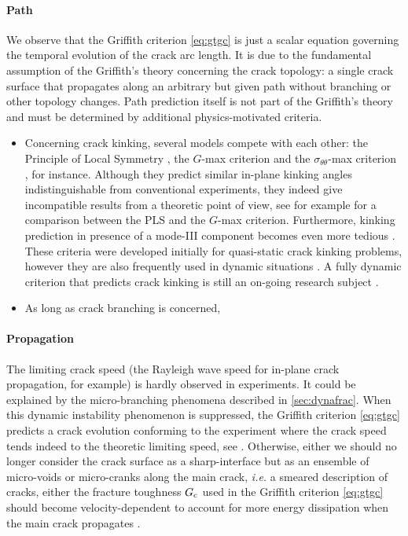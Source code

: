 \paragraph{Path} We observe that the Griffith criterion \eqref{eq:gtgc} is just a scalar equation governing the temporal evolution of the crack arc length. It is due to the fundamental assumption of the Griffith's theory concerning the crack topology: a single crack surface that propagates along an arbitrary but given path without branching or other topology changes. Path prediction itself is not part of the Griffith's theory and must be determined by additional physics-motivated criteria.
\begin{itemize}
\item Concerning crack kinking, several models compete with each other: the Principle of Local Symmetry \cite{GolDstein:1974aa}, the $G$-max criterion \cite{Hussain:1974aa} and the $\sigma_{\theta\theta}$-max criterion \cite{Erdogan:1963aa}, for instance. Although they predict similar in-plane kinking angles indistinguishable from conventional experiments, they indeed give incompatible results from a theoretic point of view, see for example \cite{ChambolleFrancfortMarigo:2009} for a comparison between the PLS and the $G$-max criterion. Furthermore, kinking prediction in presence of a mode-III component becomes even more tedious \cite{Pham:2016aa}. These criteria were developed initially for quasi-static crack kinking problems, however they are also frequently used in dynamic situations \cite{GregoireMaigreRethoreCombescure:2007,HaboussaGregoireElguedjMaigreCombescure:2011}. A fully dynamic criterion that predicts crack kinking is still an on-going research subject \cite{Adda-Bedia:2003aa}.

\item As long as crack branching is concerned,
\end{itemize}

\paragraph{Propagation} The limiting crack speed (the Rayleigh wave speed for in-plane crack propagation, for example) is hardly observed in experiments. It could be explained by the micro-branching phenomena described in \cref{sec:dynafrac}. When this dynamic instability phenomenon is suppressed, the Griffith criterion \eqref{eq:gtgc} predicts a crack evolution conforming to the experiment where the crack speed tends indeed to the theoretic limiting speed, see \cite{SharonFineberg:1999,FinebergBouchbinder:2015}. Otherwise, either we should no longer consider the crack surface as a sharp-interface but as an ensemble of micro-voids or micro-cranks along the main crack, \emph{i.e.} a smeared description of cracks, either the fracture toughness $G_\mathrm{c}$ used in the Griffith criterion \eqref{eq:gtgc} should become velocity-dependent to account for more energy dissipation when the main crack propagates \cite{SharonGrossFineberg:1996}.

